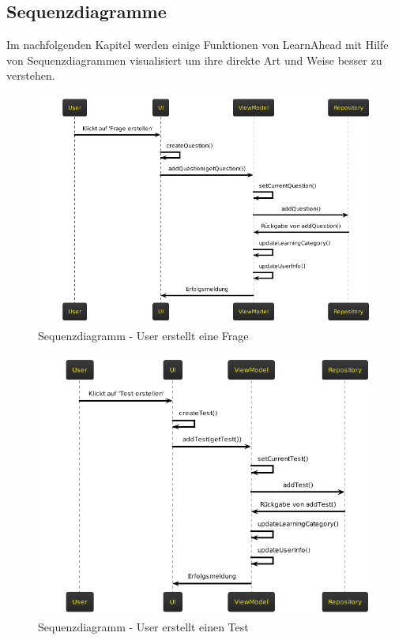 \subsection{Sequenzdiagramme} 
Im nachfolgenden Kapitel werden einige Funktionen von LearnAhead mit Hilfe von Sequenzdiagrammen visualisiert um ihre direkte Art und Weise besser zu verstehen.\\
\begin{figure}[H]
    \centering
    \includegraphics[width=1\textwidth]{images/diagramme/sequenzdiagramme/user_erstellt_frage.png}
    \caption{Sequenzdiagramm - User erstellt eine Frage}
    \label{fig:sequenz_user_erstellt_frage}
\end{figure} 
\begin{figure}[H]
    \centering
    \includegraphics[width=1\textwidth]{images/diagramme/sequenzdiagramme/user_erstellt_test.png}
    \caption{Sequenzdiagramm - User erstellt einen Test}
    \label{fig:sequenz_user_erstellt_test}
\end{figure} 
